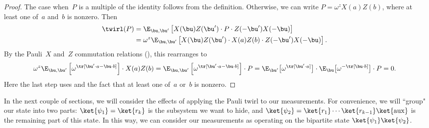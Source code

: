 \begin{proof}
The case when~$P$ is a multiple of the identity follows from the definition.
Otherwise, we can write $P = \omega^z X(a) Z(b)$, where at least one of~$a$ and~$b$ is nonzero. Then
\begin{align*}
     \twirl(P)
&=  \E_{\bu, \bu'} \left[ X(\bu) Z(\bu') \cdot P \cdot
		Z(-\bu') X(-\bu) \right]  \\
&= \omega^z \E_{\bu, \bu'} \left[ X(\bu) Z(\bu') \cdot X(a) Z(b) \cdot
		Z(-\bu') X(-\bu) \right].
\end{align*}
By the Pauli~$X$ and~$Z$ commutation relations (),
this rearranges to
\begin{equation*}
 \omega^z \E_{\bu, \bu'} \left[\omega^{\tr[\bu' \cdot a - \bu \cdot b]}\right] \cdot X(a) Z(b)
=  \E_{\bu, \bu'} \left[ \omega^{\tr[\bu' \cdot a - \bu \cdot b]} \right] \cdot P
    =  \E_{\bu'} \big[ \omega^{\tr[\bu' \cdot a]}\big] \cdot \E_{\bu}\big[\omega^{- \tr[\bu \cdot b]} \big] \cdot P
    = 0.
\end{equation*}
Here the last step uses  and the fact that at least one of~$a$ or~$b$ is nonzero.
\end{proof}

In the next couple of sections,
we will consider the effects of applying the Pauli twirl to our measurements.
For convenience, we will ``group" our state into two parts: $\ket{\psi_1} = \ket{r_k}$ 
is the subsystem we want to hide,
and $\ket{\psi_2} = \ket{r_1} \cdots \ket{r_{k-1}} \ket{\mathrm{aux}}$ is the remaining part of this state.
In this way, we can consider our measurements as operating on the bipartite state $\ket{\psi_1} \ket{\psi_2}$.

